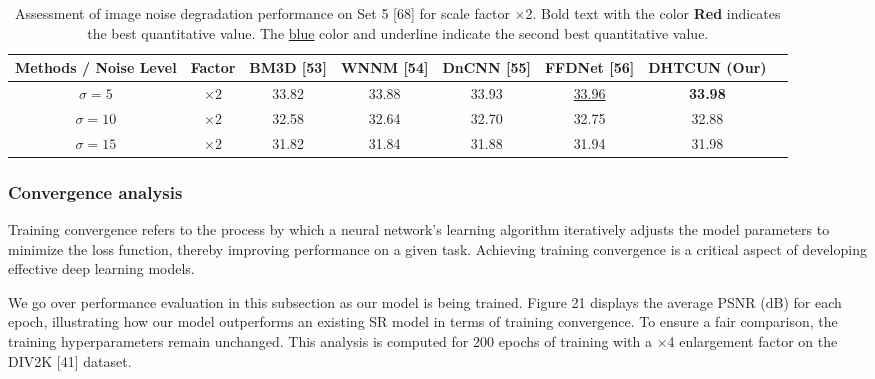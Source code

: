 \documentclass{ieeeaccess}
\begin{document}
\begin{table}
\centering
\caption{Assessment of image noise degradation performance on Set 5 [68] for scale factor $\times$2. Bold text with the color {\color{red}\textbf{Red }} indicates the best quantitative value. The {\color{blue}\underline{blue}} color and underline indicate the second best quantitative value.}

\label{table6}
\setlength{\tabcolsep}{2 pt}
\begin{tabular}{|c|c|c|c|c|c|c|c|} %
\hline
\multirow{1}{*}{Methods / Noise Level} & \multirow{1}{*}{Factor} & \multirow{1}{*}{BM3D [53]} & \multirow{1}{*}{WNNM [54]} & \multirow{1}{*}{DnCNN  [55]} & \multirow{1}{*}{FFDNet [56]}  & \multirow{1}{*}{DHTCUN (Our)}\\

\hline
$\sigma = 5$ & $\times2$  & {33.82} & {33.88} & {33.93} & {\color{blue}\underline{33.96}} & {\color{red}\textbf{33.98}}   \\
$\sigma = 10$ & $\times2$   & {32.58} & {32.64} & {32.70} & {32.75} & {32.88}   \\
$\sigma = 15$ & $\times2$  & {31.82} & {31.84} & {31.88} & {31.94} & {31.98}   \\
    
\hline
\end{tabular}
\end{table}


\subsubsection{Convergence analysis}

Training convergence refers to the process by which a neural network’s learning algorithm iteratively adjusts the model parameters to minimize the loss function, thereby improving performance on a given task. Achieving training convergence is a critical aspect of developing effective deep learning models. 

We go over performance evaluation in this subsection as our model is being trained. Figure 21 displays the average PSNR (dB) for each epoch, illustrating how our model outperforms an existing SR model in terms of training convergence. To ensure a fair comparison, the training hyperparameters remain unchanged. This analysis is computed for 200 epochs of training with a ×4 enlargement factor on the DIV2K [41] dataset.
\end{document}
